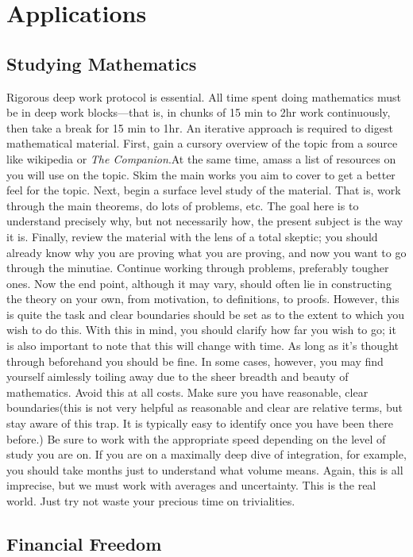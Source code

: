 \documentclass{book}
\numberwithin{equation}{section}
\begin{document}
\chapter{Applications}


\section{Studying Mathematics}
Rigorous deep work protocol is essential. All time spent doing mathematics must be in deep work blocks---that is, in chunks of 15 min to 2hr work continuously, then take a break for 15 min to 1hr. An iterative approach is required to digest mathematical material. First, gain a cursory overview of the topic from a source like wikipedia or \emph{The Companion}.At the same time, amass a list of resources on you will use on the topic. Skim the main works you aim to cover to get a better feel for the topic.
 Next, begin a surface level study of the material. That is, work through the main theorems, do lots of problems, etc. The goal here is to understand precisely why, but not necessarily how, the present subject is the way it is. Finally, review the material with the lens of a total skeptic; you should already know why you are proving what you are proving, and now you want to go through the minutiae. Continue working through problems, preferably tougher ones. Now the end point, although it may vary, should often lie in constructing the theory on your own, from motivation, to definitions, to proofs. However, this is quite the task and clear boundaries should be set as to the extent to which you wish to do this. With this in mind, you should clarify how far you wish to go; it is also important to note that this will change with time. As long as it's thought through beforehand you should be fine. In some cases, however, you may find yourself aimlessly toiling away due to the sheer breadth and beauty of mathematics. Avoid this at all costs. Make sure you have reasonable, clear boundaries(this is not very helpful as reasonable and clear are relative terms, but stay aware of this trap. It is typically easy to identify once you have been there before.)
Be sure to work with the appropriate speed depending on the level of study you are on. If you are on a maximally deep dive of integration, for example, you should take months just to understand what volume means. Again, this is all imprecise, but we must work with averages and uncertainty. This is the real world. Just try not waste your precious time on trivialities. 
\section{Financial Freedom}
\end{document}
